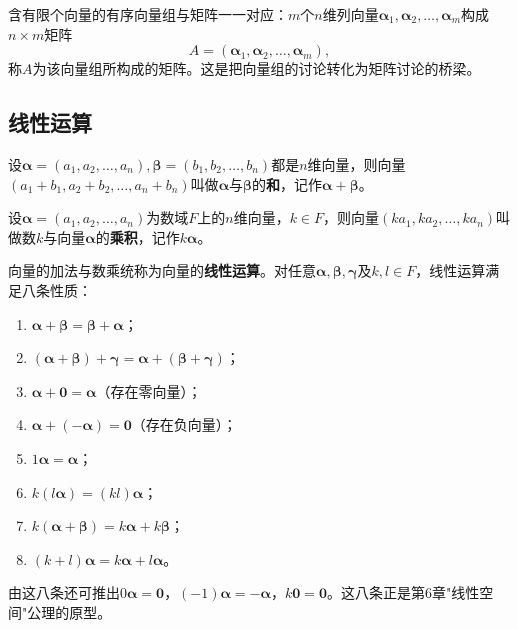 含有限个向量的有序向量组与矩阵一一对应：$m$个$n$维列向量$\boldsymbol{\alpha}_1,\boldsymbol{\alpha}_2,\dots,\boldsymbol{\alpha}_m$构成$n\times m$矩阵
\[
A=(\boldsymbol{\alpha}_1,\boldsymbol{\alpha}_2,\dots,\boldsymbol{\alpha}_m),
\]
称$A$为该向量组所构成的矩阵。这是把向量组的讨论转化为矩阵讨论的桥梁。

\subsection{线性运算}
\begin{definition}[向量加法]
设$\boldsymbol{\alpha}=(a_1,a_2,\dots,a_n),\boldsymbol{\beta}=(b_1,b_2,\dots,b_n)$都是$n$维向量，则向量$(a_1+b_1,a_2+b_2,\dots,a_n+b_n)$叫做$\boldsymbol{\alpha}$与$\boldsymbol{\beta}$的\textbf{和}，记作$\boldsymbol{\alpha}+\boldsymbol{\beta}$。
\end{definition}

\begin{definition}[数乘]
设$\boldsymbol{\alpha}=(a_1,a_2,\dots,a_n)$为数域$F$上的$n$维向量，$k\in F$，则向量$(ka_1,ka_2,\dots,ka_n)$叫做数$k$与向量$\boldsymbol{\alpha}$的\textbf{乘积}，记作$k\boldsymbol{\alpha}$。
\end{definition}

向量的加法与数乘统称为向量的\textbf{线性运算}。对任意$\boldsymbol{\alpha},\boldsymbol{\beta},\boldsymbol{\gamma}$及$k,l\in F$，线性运算满足八条性质：
\begin{enumerate}
    \item $\boldsymbol{\alpha}+\boldsymbol{\beta}=\boldsymbol{\beta}+\boldsymbol{\alpha}$；
    \item $(\boldsymbol{\alpha}+\boldsymbol{\beta})+\boldsymbol{\gamma}=\boldsymbol{\alpha}+(\boldsymbol{\beta}+\boldsymbol{\gamma})$；
    \item $\boldsymbol{\alpha}+\boldsymbol{0}=\boldsymbol{\alpha}$（存在零向量）；
    \item $\boldsymbol{\alpha}+(-\boldsymbol{\alpha})=\boldsymbol{0}$（存在负向量）；
    \item $1\boldsymbol{\alpha}=\boldsymbol{\alpha}$；
    \item $k(l\boldsymbol{\alpha})=(kl)\boldsymbol{\alpha}$；
    \item $k(\boldsymbol{\alpha}+\boldsymbol{\beta})=k\boldsymbol{\alpha}+k\boldsymbol{\beta}$；
    \item $(k+l)\boldsymbol{\alpha}=k\boldsymbol{\alpha}+l\boldsymbol{\alpha}$。
\end{enumerate}
由这八条还可推出$0\boldsymbol{\alpha}=\boldsymbol{0}$，$(-1)\boldsymbol{\alpha}=-\boldsymbol{\alpha}$，$k\boldsymbol{0}=\boldsymbol{0}$。这八条正是第6章"线性空间"公理的原型。

